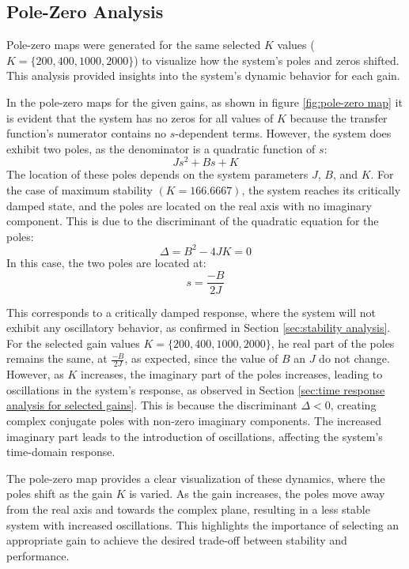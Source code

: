 \documentclass[a4paper, 12pt, english]{article}
\begin{document}
\subsection{Pole-Zero Analysis} \label{sec:pole-zero analysis for selected gains}
Pole-zero maps were generated for the same selected $K$ values ($ {K} = {\{ 200, 400, 1000, 2000 \}} $) to visualize how the system’s poles and zeros shifted. This analysis provided insights into the system’s dynamic behavior for each gain.



\noindent
In the pole-zero maps for the given gains, as shown in figure \ref{fig:pole-zero map} it is evident that the system has no zeros for all values of $K$  because the transfer function's numerator contains no $s$-dependent terms. However, the system does exhibit two poles, as the denominator is a quadratic function of $s$:
\[ {J}{{s}^{2}} + {B}{s} + {K} \]
The location of these poles depends on the system parameters $J$, $B$, and $K$. For the case of maximum stability $\left( {K} = 166.6667 \right)$, the system reaches its critically damped state, and the poles are located on the real axis with no imaginary component. This is due to the discriminant of the quadratic equation for the poles:
\[ \Delta = {{B}^{2}} - {4}{J}{K} = 0 \]
In this case, the two poles are located at:
\[ {s} = \frac{-B}{2J} \]

\noindent
This corresponds to a critically damped response, where the system will not exhibit any oscillatory behavior, as confirmed in Section \ref{sec:stability analysis}.
For the selected gain values $ {K} = {\{ 200, 400, 1000, 2000 \}} $, he real part of the poles remains the same, at $ \frac{-B}{2J} $, as expected, since the value of $B$ an $J$ do not change. However, as $K$ increases, the imaginary part of the poles increases, leading to oscillations in the system's response, as observed in Section \ref{sec:time response analysis for selected gains}. This is because the discriminant $ \Delta < 0 $, creating complex conjugate poles with non-zero imaginary components. The increased imaginary part leads to the introduction of oscillations, affecting the system's time-domain response.\newline

The pole-zero map provides a clear visualization of these dynamics, where the poles shift as the gain $K$ is varied. As the gain increases, the poles move away from the real axis and towards the complex plane, resulting in a less stable system with increased oscillations. This highlights the importance of selecting an appropriate gain to achieve the desired trade-off between stability and performance.
\end{document}
